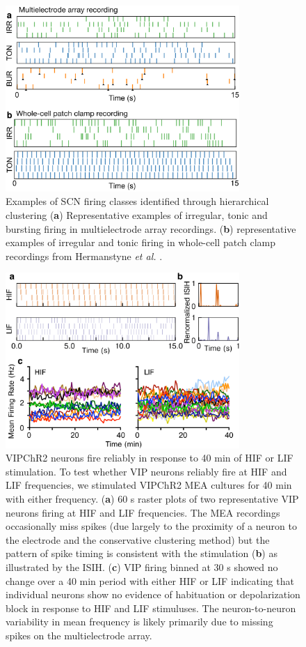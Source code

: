 \begin{figure}[p]
    \begin{center}
        \includegraphics[width=3.5in]{chap5/figures/SupplementaryFigure4.png}
    \end{center}
    \caption{\label{fig:cms4} 
    Examples of SCN firing classes identified through hierarchical clustering
    (\textbf{a}) Representative examples of irregular, tonic and bursting firing in multielectrode array recordings. 
    (\textbf{b}) representative examples of irregular and tonic firing in whole-cell patch clamp recordings from Hermanstyne \textit{et al.} \cite{Hermanstyne2016}. 
    }
\end{figure}

\begin{figure}[p]
    \begin{center}
        \includegraphics[width=3.5in]{chap5/figures/SupplementaryFigure5.png}
    \end{center}
    \caption{\label{fig:cms5} 
VIPChR2 neurons fire reliably in response to 40 min of HIF or LIF stimulation.
To test whether VIP neurons reliably fire at HIF and LIF frequencies, we stimulated VIPChR2 MEA cultures for 40 min with either frequency. 
(\textbf{a}) 60 s raster plots of two representative VIP neurons firing at HIF and LIF frequencies. The MEA recordings occasionally miss spikes (due largely to the proximity of a neuron to the electrode and the conservative clustering method) but the pattern of spike timing is consistent with the stimulation 
(\textbf{b}) as illustrated by the ISIH. 
(\textbf{c}) VIP firing binned at 30 s showed no change over a 40 min period with either HIF or LIF indicating that individual neurons show no evidence of habituation or depolarization block in response to HIF and LIF stimuluses. The neuron-to-neuron variability in mean frequency is likely primarily due to missing spikes on the multielectrode array.
    }
\end{figure}


